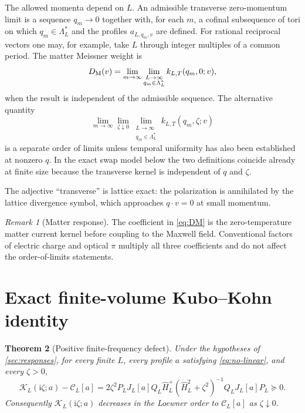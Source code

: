 \documentclass[11pt]{article}
\newtheorem{theorem}{Theorem}[section]
\theoremstyle{definition}
\theoremstyle{remark}
\newtheorem{remark}[theorem]{Remark}
\newcommand{\cK}{\mathcal K}
\newcommand{\cC}{\mathcal C}
\newcommand{\I}{\mathrm i}
\begin{document}
The allowed momenta depend on $L$.  An admissible transverse zero-momentum limit is a sequence
$q_m\to0$ together with, for each $m$, a cofinal subsequence of tori on which
$q_m\in\Lambda_L^*$ and the profiles $a_{L,q_m,v}$ are defined.  For rational reciprocal vectors one
may, for example, take $L$ through integer multiples of a common period.  The matter Meissner weight is
\begin{equation}
 D_{\rm M}(v)
 =\lim_{m\to\infty}\lim_{\substack{L\to\infty\\q_m\in\Lambda_L^*}}
 k_{L,T}(q_m,0;v),
 \label{eq:DM}
\end{equation}
when the result is independent of the admissible sequence.  The alternative quantity
\begin{equation}
 \lim_{m\to\infty}\lim_{\zeta\downarrow0}\lim_{\substack{L\to\infty\\q_m\in\Lambda_L^*}}
 k_{L,T}(q_m,\zeta;v)
\end{equation}
is a separate order of limits unless temporal uniformity has also been established at nonzero $q$.  In the
exact swap model below the two definitions coincide already at finite size because the transverse kernel is
independent of $q$ and $\zeta$.

The adjective ``transverse'' is lattice exact: the polarization is annihilated by the lattice divergence
symbol, which approaches $q\cdot v=0$ at small momentum.

\begin{remark}[Matter response]
The coefficient in \eqref{eq:DM} is the zero-temperature matter current kernel before coupling to the
Maxwell field.  Conventional factors of electric charge and optical $\pi$ multiply all three coefficients
and do not affect the order-of-limits statements.
\end{remark}

\section{Exact finite-volume Kubo--Kohn identity}
\label{sec:finite-identity}

\begin{theorem}[Positive finite-frequency defect]
\label{thm:positive-defect}
Under the hypotheses of \cref{sec:responses}, for every finite $L$, every profile $a$ satisfying
\eqref{eq:no-linear}, and every $\zeta>0$,
\begin{equation}
 \boxed{
 \cK_L(\I\zeta;a)-\cC_L[a]
 =2\zeta^2P_LJ_L[a]Q_L\widehat H_L^+
 (\widehat H_L^2+\zeta^2)^{-1}Q_LJ_L[a]P_L\succeq0.}
 \label{eq:positive-defect}
\end{equation}
Consequently $\cK_L(\I\zeta;a)$ decreases in the Loewner order to $\cC_L[a]$ as
$\zeta\downarrow0$.
\end{theorem}
\end{document}
